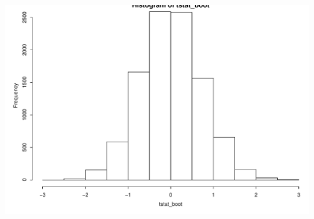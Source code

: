 \documentclass{beamer}\usepackage[]{graphicx}\usepackage[]{color}
\newenvironment{knitrout}{}{} %
\renewenvironment{knitrout}{\begin{spacing}{0.75}\begin{tiny}}{\end{tiny}\end{spacing}}
\begin{document}
\begin{frame}[fragile]

\begin{knitrout}\small
{}\color{fgcolor}

{\centering \includegraphics[width=0.99\linewidth]{figure/graphics-unnamed-chunk-12-1} 

}



\end{knitrout}

\end{frame}
\end{document}
